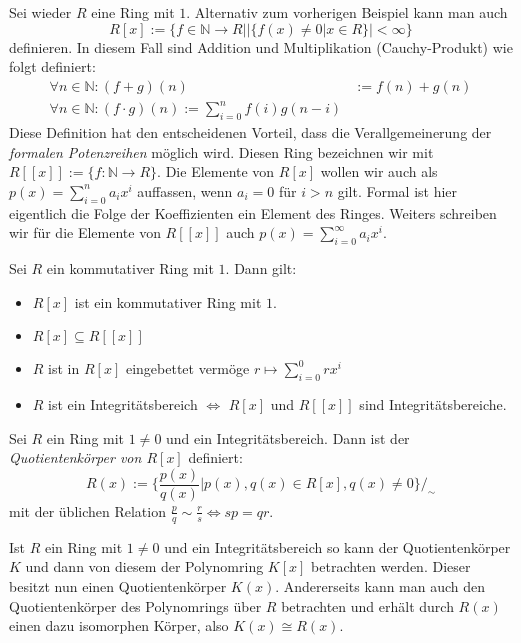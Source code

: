 \begin{example}
    Sei wieder $R$ eine Ring mit $1$. Alternativ zum vorherigen Beispiel kann man auch
    $$R[x]:=\{f\in\mathbb{N}\to R||\{f(x)\neq 0|x\in R\}|<\infty\}$$
    definieren. In diesem Fall sind Addition und Multiplikation (Cauchy-Produkt) wie folgt definiert:
    \begin{align*}
        \forall n\in\mathbb{N}:(f+g)(n)&:=f(n)+g(n)\\
        \forall n\in\mathbb{N}:(f\cdot g)(n):=\sum_{i=0}^nf(i)g(n-i)
    \end{align*}
    Diese Definition hat den entscheidenen Vorteil, dass die Verallgemeinerung der \emph{formalen Potenzreihen}
    möglich wird. Diesen Ring bezeichnen wir mit $R[[x]]:=\{f:\mathbb{N}\to R\}$. Die Elemente von 
    $R[x]$ wollen wir auch als $p(x)=\sum_{i=0}^na_ix^i$ auffassen, wenn $a_i=0$ für $i>n$ gilt. Formal ist hier eigentlich die Folge
    der Koeffizienten ein Element des Ringes. Weiters schreiben wir für die Elemente von $R[[x]]$ auch
    $p(x)=\sum_{i=0}^\infty a_ix^i$.
\end{example}

\begin{proposition}
    Sei $R$ ein kommutativer Ring mit $1$. Dann gilt:
    \begin{itemize}
        \item $R[{x}]$ ist ein kommutativer Ring mit $1$.
        \item $R[x]\subseteq R[[x]]$
        \item $R$ ist in $R[x]$ eingebettet vermöge $r\mapsto \sum_{i=0}^0rx^i$
        \item $R$ ist ein Integritätsbereich $\Leftrightarrow$ $R[x]$ und $R[[x]]$ sind Integritätsbereiche.
    \end{itemize}
\end{proposition}

\begin{definition}
    Sei $R$ ein Ring mit $1\neq 0$ und ein Integritätsbereich. Dann ist der \emph{Quotientenk\"orper von $R[x]$}
    definiert:
    $$R(x):=\{\frac{p(x)}{q(x)}|p(x),q(x)\in R[x],q(x)\neq 0\}/_\sim$$
    mit der üblichen Relation $\frac{p}{q}\sim \frac{r}{s}\Leftrightarrow sp=qr$.
\end{definition}

\begin{remark}
    Ist $R$ ein Ring mit $1\neq 0$ und ein Integritätsbereich so kann der Quotientenk\"orper $K$ und dann von diesem
    der Polynomring $K[x]$ betrachten werden. Dieser besitzt nun einen Quotientenk\"orper $K(x)$. Andererseits
    kann man auch den Quotientenk\"orper des Polynomrings über $R$ betrachten und erhält durch $R(x)$ einen dazu isomorphen Körper,
    also $K(x)\cong R(x)$.
\end{remark}

